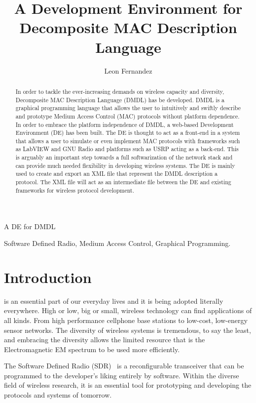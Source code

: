 \documentclass[journal,comsoc]{IEEEtran}
\begin{document}
\title{A Development Environment for Decomposite MAC Description Language}
\author{Leon Fernandez}
%
{A DE for DMDL}
\maketitle

\begin{abstract}
In order to tackle the ever-increasing demands on wireless capacity and diversity,
Decomposite MAC Description Language (DMDL) has be developed. DMDL is a graphical
programming language that allows the user to intuitively and swiftly describe and
prototype Medium Access Control (MAC) protocols without platform dependence.
In order to embrace the platform independence of DMDL, a web-based Development Environment (DE)
has been built. The DE is thought to act as a front-end in a system that allows a user to
simulate or even implement MAC protocols with frameworks such as LabVIEW and GNU Radio and
platforms such as USRP acting as a back-end. This is arguably an important step towards a
full softwarization of the network stack and can provide much needed flexibility in developing
wireless systems. The DE is mainly used to create and export an XML file that represent the DMDL
description a protocol. The XML file will act as an intermediate file between the DE and existing
frameworks for wireless protocol development.

\end{abstract}

\begin{IEEEkeywords}
Software Defined Radio, Medium Access Control, Graphical Programming.
\end{IEEEkeywords}

\section{Introduction}
 is an essential part of our everyday lives and it is
being adopted literally everywhere. High or low, big or small, wireless technology can
find applications of all kinds. From high performance cellphone base stations to low-cost,
low-energy sensor networks. The diversity of wireless systems is tremendous, to say the least,
and embracing the diversity allows the limited resource that is the Electromagnetic EM spectrum to
be used more efficiently.

The Software Defined Radio (SDR)~\cite{sdr} is a reconfigurable transceiver that can be programmed
to the developer's liking entirely by software. Within the diverse field of wireless research,
it is an essential tool for prototyping and developing the protocols and systems of tomorrow.
\end{document}

